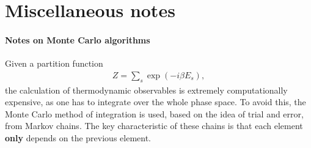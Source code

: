 \section{Miscellaneous notes}

\paragraph{Notes on Monte Carlo algorithms}
Given a partition function 
\begin{align}
	Z = \sum_s \exp{(-i\beta E_s)},
\end{align}
the calculation of thermodynamic observables is extremely computationally expensive, as one has to integrate over the whole phase space.
To avoid this, the Monte Carlo method of integration is used, based on the idea of trial and error, from Markov chains. The key characteristic of these chains is that each element \textbf{only} depends on the previous element.

